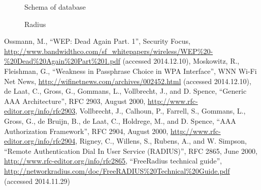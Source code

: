 \documentclass{llncs}
\begin{document}
\begin{figure}
\vspace{-15pt}
\caption{Schema of database}
\end{figure}

\begin{figure}
\vspace{-15pt}
\caption{Radius}
\end{figure}

%
%
\begin{thebibliography}{}
%
Ossmann, M., ``WEP: Dead Again Part. 1'', Security Focus, 
\url{http://www.bandwidthco.com/sf_whitepapers/wireless/WEP%20-%20Dead%20Again%20Part%201.pdf}
(accessed 2014.12.10),
Moskowitz, R., Fleishman, G., ``Weakness in Passphrase Choice in WPA Interface'',
WNN Wi-Fi Net News, \url{http://wifinetnews.com/archives/002452.html} (accessed
2014.12.10),
de Laat, C., Gross, G., Gommans, L., Vollbrecht, J., and D. Spence, ``Generic AAA
Architecture'', RFC 2903, August 2000,
\url{http://www.rfc-editor.org/info/rfc2903},
Vollbrecht, J., Calhoun, P., Farrell, S., Gommans, L., Gross, G., de Bruijn, B.,
de Laat, C., Holdrege, M., and D. Spence, ``AAA Authorization Framework'', RFC
2904, August 2000, \url{http://www.rfc-editor.org/info/rfc2904},
Rigney, C., Willens, S., Rubens, A., and W. Simpson, ``Remote  Authentication
Dial In User Service (RADIUS)'', RFC 2865, June 2000,
\url{http://www.rfc-editor.org/info/rfc2865},
``FreeRadius technical guide'',
\url{http://networkradius.com/doc/FreeRADIUS%20Technical%20Guide.pdf} (accessed 2014.11.29)
\end{thebibliography}


\clearpage
{} %
\renewcommand{\indexname}{Author Index}
\printindex
\clearpage
{} %
\renewcommand{\indexname}{Subject Index}

\end{document}
